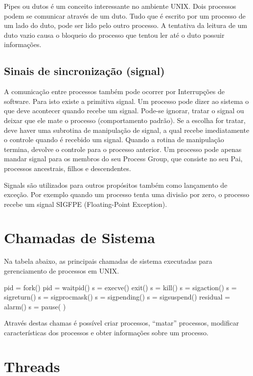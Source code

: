 Pipes ou dutos é um conceito interessante no ambiente UNIX. Dois processos podem se comunicar através de um duto. Tudo que é escrito por um processo de um lado do duto, pode ser lido pelo outro processo. A tentativa da leitura de um duto vazio causa o bloqueio do processo que tentou ler até o duto possuir informações.

\subsection{Sinais de sincronização (signal)}

A comunicação entre processos também pode ocorrer por Interrupções de software. Para isto existe a primitiva signal. Um processo pode dizer ao sistema o que deve acontecer quando recebe um signal. Pode-se ignorar, tratar o signal ou deixar que ele mate o processo (comportamento padrão). Se a escolha for tratar, deve haver uma subrotina de manipulação de signal, a qual recebe imediatamente o controle quando é recebido um signal. Quando a rotina de manipulação termina, devolve o controle para o processo anterior. Um processo pode apenas mandar signal para os membros do seu Process Group, que consiste no seu Pai, processos ancestrais, filhos e descendentes. 

Signals são utilizados para outros propósitos também como lançamento de exceção. Por exemplo quando um processo tenta uma divisão por zero, o processo recebe um signal SIGFPE (Floating-Point Exception).

\section{Chamadas de Sistema}

Na tabela abaixo, as principais chamadas de sistema executadas para gerenciamento de processos em UNIX.

	pid = fork()   
	pid = waitpid()
	s = execve()
	exit()
	s = kill()
	s = sigaction()                    
	s = sigreturn()
	s = sigprocmask()
	s = sigpending()
	s = sigsuspend()               
	residual = alarm()
	s = pause( )

Através destas chamas é possível criar processos, “matar” processos, modificar características dos processos e obter informações sobre um processo.

\section{Threads}

